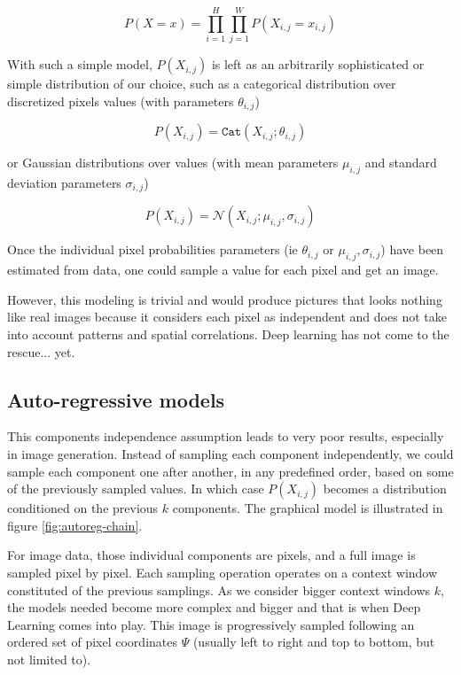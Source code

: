 \begin{equation}
\label{gen_model1}
    P(X=x) = \prod_{i=1}^H \prod_{j=1}^W P(X_{i, j}=x_{i, j})
\end{equation}

With such a simple model, $P(X_{i, j})$ is left as an arbitrarily sophisticated or simple distribution of our choice, such as a categorical distribution over discretized pixels values (with parameters $\theta_{i,j}$)

\begin{equation}
    P(X_{i, j}) = \texttt{Cat}(X_{i,j}; \theta_{i,j})
\end{equation}

or Gaussian distributions over values (with mean parameters $\mu_{i,j}$ and standard deviation parameters $\sigma_{i,j}$)

\begin{equation}
P(X_{i, j}) = \mathcal{N}(X_{i,j}; \mu_{i,j}, \sigma_{i,j})    
\end{equation}


Once the individual pixel probabilities parameters (ie $\theta_{i,j}$ or $\mu_{i,j}, \sigma_{i, j}$) have been estimated from data, one could sample a value for each pixel and get an image.

However, this modeling is trivial and would produce pictures that looks nothing like real images because it considers each pixel as independent and does not take into account patterns and spatial correlations. Deep learning has not come to the rescue... yet.

\subsection{Auto-regressive models}

This components independence assumption leads to very poor results, especially in image generation. Instead of sampling each component independently, we could sample each component one after another, in any predefined order, based on some of the previously sampled values. In which case $P(X_{i,j})$ becomes a distribution conditioned on the previous $k$ components. The graphical model is illustrated in figure \ref{fig:autoreg-chain}.

For image data, those individual components are pixels, and a full image is sampled pixel by pixel. Each sampling operation operates on a context window constituted of the previous samplings. As we consider bigger context windows $k$, the models needed become more complex and bigger and that is when Deep Learning comes into play. This image is progressively sampled following an ordered set of pixel coordinates $\Psi$ (usually left to right and top to bottom, but not limited to).

